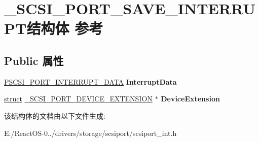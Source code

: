\hypertarget{struct___s_c_s_i___p_o_r_t___s_a_v_e___i_n_t_e_r_r_u_p_t}{}\section{\+\_\+\+S\+C\+S\+I\+\_\+\+P\+O\+R\+T\+\_\+\+S\+A\+V\+E\+\_\+\+I\+N\+T\+E\+R\+R\+U\+P\+T结构体 参考}
\label{struct___s_c_s_i___p_o_r_t___s_a_v_e___i_n_t_e_r_r_u_p_t}
\subsection*{Public 属性}
\begin{DoxyCompactItemize}
\item 
\mbox{\label{struct___s_c_s_i___p_o_r_t___s_a_v_e___i_n_t_e_r_r_u_p_t_a54542743f4b6d9a9f96d66df5ce41b9e}} 
\hyperlink{struct___s_c_s_i___p_o_r_t___i_n_t_e_r_r_u_p_t___d_a_t_a}{P\+S\+C\+S\+I\+\_\+\+P\+O\+R\+T\+\_\+\+I\+N\+T\+E\+R\+R\+U\+P\+T\+\_\+\+D\+A\+TA} {\bfseries Interrupt\+Data}
\item 
\mbox{\label{struct___s_c_s_i___p_o_r_t___s_a_v_e___i_n_t_e_r_r_u_p_t_a43c1990e9d9b541c5ee2e73d07fc3613}} 
\hyperlink{interfacestruct}{struct} \hyperlink{struct___s_c_s_i___p_o_r_t___d_e_v_i_c_e___e_x_t_e_n_s_i_o_n}{\+\_\+\+S\+C\+S\+I\+\_\+\+P\+O\+R\+T\+\_\+\+D\+E\+V\+I\+C\+E\+\_\+\+E\+X\+T\+E\+N\+S\+I\+ON} $\ast$ {\bfseries Device\+Extension}
\end{DoxyCompactItemize}


该结构体的文档由以下文件生成\+:\begin{DoxyCompactItemize}
\item 
E\+:/\+React\+O\+S-\/0../drivers/storage/scsiport/scsiport\+\_\+int.\+h\end{DoxyCompactItemize}
